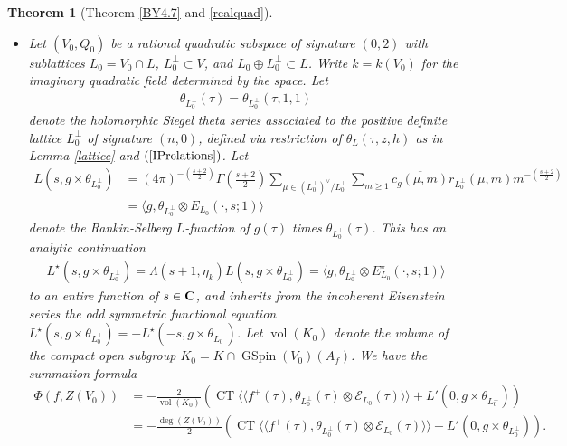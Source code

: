 \documentclass{amsart}
\newtheorem{theorem}{Theorem}[section]
\theoremstyle{definition}
\theoremstyle{definition}
\theoremstyle{definition}
\begin{document}
\begin{theorem}[Theorem \ref{BY4.7} and \ref{realquad}]
\begin{itemize}
\item[(i)] Let $(V_0, Q_0)$ be a rational quadratic subspace of signature $(0, 2)$ with sublattices $L_0 = V_0 \cap L$,
$L_0^{\perp} \subset V$, and $L_0 \oplus L_0^{\perp} \subset L$. 
Write $k = k(V_0)$ for the imaginary quadratic field determined by the space.
Let \begin{align*} \theta_{L_0^{\perp}}(\tau) = \theta_{L_0^{\perp}}(\tau, 1, 1)\end{align*} 
denote the holomorphic Siegel theta series associated to the positive definite lattice $L_0^{\perp}$ of signature $(n,0)$,
defined via restriction of $\theta_L(\tau, z, h)$ as in Lemma \ref{lattice} and $(\ref{IPrelations})$. Let 
\begin{align*} L(s, g \times \theta_{L_0^{\perp}}) &= (4 \pi)^{- \left( \frac{s+2}{2} \right)} \Gamma \left(\frac{s+2}{2} \right)
\sum\limits_{ \mu \in (L_0^{\perp})^{\vee}/L_0^{\perp}  } \sum\limits_{m \geq 1} \overline{c_g(\mu, m)} r_{L_0^{\perp}}(\mu, m) m^{-\left( \frac{s+2}{2} \right)} \\
&= \langle g, \theta_{L_0^{\perp}}\otimes E_{L_0}(\cdot, s; 1) \rangle \end{align*}
denote the Rankin-Selberg $L$-function of $g(\tau)$ times $\theta_{L_0^{\perp}}(\tau)$. %
This has an analytic continuation 
\begin{align*} L^{\star}(s, g \times \theta_{L_0^{\perp}}) = \Lambda(s+1, \eta_k) L(s, g \times \theta_{L_0^{\perp}}) = \langle g, \theta_{L_0^{\perp}}\otimes E^{\star}_{L_0}(\cdot, s; 1)   \rangle \end{align*}
to an entire function of $s \in {\bf{C}}$, and inherits from the incoherent Eisenstein series the odd symmetric functional equation 
$L^{\star}(s, g \times \theta_{L_0^{\perp}}) = - L^{\star}(-s, g \times \theta_{L_0^{\perp}})$. Let $\operatorname{vol}(K_0)$ denote the volume
of the compact open subgroup $K_0 = K \cap \operatorname{GSpin}(V_0)({{A}}_f)$. We have the summation formula 
\begin{align*} \Phi(f, Z(V_0)) &= - \frac{2}{\operatorname{vol}(K_0)} \left(
\operatorname{CT} \langle \langle f^+(\tau), \theta_{L_0^{\perp}}(\tau) \otimes \mathcal{E}_{L_0}(\tau) \rangle \rangle + L'(0, g \times \theta_{L_0^{\perp}}) \right) \\
&= - \frac{\operatorname{deg}(Z(V_0))}{2} \left( \operatorname{CT} \langle \langle f^+(\tau), \theta_{L_0^{\perp}}(\tau) \otimes \mathcal{E}_{L_0}(\tau) \rangle \rangle
+ L'(0, g \times \theta_{L_0^{\perp}}) \right). \\ \end{align*} 


\end{itemize}
\end{theorem}
\end{document}

